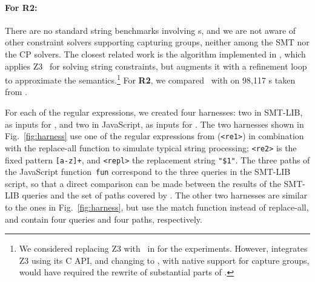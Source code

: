 \paragraph{For \textbf{R2}:} There are no standard string benchmarks
involving {\regexp}s, and we are not aware of other constraint solvers
supporting capturing groups, neither among the SMT nor the CP
solvers. %
The closest related work is the algorithm implemented in \expose{}, which
applies Z3~\cite{Z3} for solving string constraints, but augments
it with a refinement loop to approximate the {\regexp}
semantics.\footnote{We considered replacing Z3 with \ostrich\ in
  \expose{} for the experiments. However, \expose{} integrates Z3 using its
  C API, and changing to \ostrich, with native support
  for capture groups, would have required the rewrite of substantial
  parts of \expose{}.}
%
For \textbf{R2}, we compared \ostrich\ with \expose{} on 98,117
{\regexp}s taken from \cite{DMC+19}.

For each of the regular expressions, we created four harnesses: two in
SMT-LIB, as inputs for \ostrich, and two in JavaScript, as inputs for
\expose{}. The two harnesses shown in Fig.~\ref{fig:harness} use one of the
regular expressions from \cite{DMC+19} (\verb!<re1>!) in combination with
the replace-all function to simulate typical string processing;
\verb!<re2>! is the fixed pattern \verb![a-z]+!, and \verb!<repl>! the
replacement string \verb!"$1"!. The three paths of the JavaScript
function~\verb!fun! correspond to the three queries in the SMT-LIB
script, so that a direct comparison can be made between the results of
the SMT-LIB queries and the set of paths covered by \expose{}. The other
two harnesses are similar to the ones in Fig.~\ref{fig:harness}, but
use the match function instead of replace-all, and contain four
queries and four paths, respectively.


